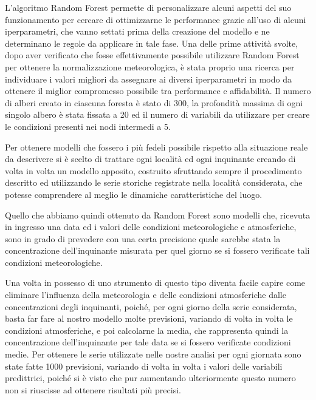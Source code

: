 L'algoritmo Random Forest permette di personalizzare alcuni aspetti del suo funzionamento per cercare di ottimizzarne le performance grazie all'uso di alcuni iperparametri, che vanno settati prima della creazione del modello e ne determinano le regole da applicare in tale fase. Una delle prime attività svolte, dopo aver verificato che fosse effettivamente possibile utilizzare Random Forest per ottenere la normalizzazione meteorologica, è stata proprio una ricerca per individuare i valori migliori da assegnare ai diversi iperparametri in modo da ottenere il miglior compromesso possibile tra performance e affidabilità. Il numero di alberi creato in ciascuna foresta è stato di 300, la profondità massima di ogni singolo albero è stata fissata a 20 ed il numero di variabili da utilizzare per creare le condizioni presenti nei nodi intermedi a 5.

Per ottenere modelli che fossero i più fedeli possibile rispetto alla situazione reale da descrivere si è scelto di trattare ogni località ed ogni inquinante creando di volta in volta un modello apposito, costruito sfruttando sempre il procedimento descritto ed utilizzando le serie storiche registrate nella località considerata, che potesse comprendere al meglio le dinamiche caratteristiche del luogo.

Quello che abbiamo quindi ottenuto da Random Forest sono modelli che, ricevuta in ingresso una data ed i valori delle condizioni meteorologiche e atmosferiche, sono in grado di prevedere con una certa precisione quale sarebbe stata la concentrazione dell'inquinante misurata per quel giorno se si fossero verificate tali condizioni meteorologiche.  

Una volta in possesso di uno strumento di questo tipo diventa facile capire come eliminare l'influenza della meteorologia e delle condizioni atmosferiche dalle concentrazioni degli inquinanti, poiché, per ogni giorno della serie considerata, basta far fare al nostro modello molte previsioni, variando di volta in volta le condizioni atmosferiche, e poi calcolarne la media, che rappresenta quindi la concentrazione dell'inquinante per tale data se si fossero verificate condizioni medie. Per ottenere le serie utilizzate nelle nostre analisi per ogni giornata sono state fatte 1000 previsioni, variando di volta in volta i valori delle variabili predittrici, poiché si è visto che pur aumentando ulteriormente questo numero non si riuscisse ad ottenere risultati più precisi.

